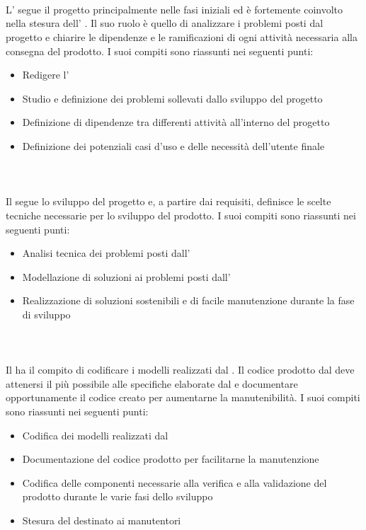 \paragraph{\ana{}}\mbox{}\\
\mbox{}\\
L' \ana{} segue il progetto principalmente nelle fasi iniziali ed è fortemente coinvolto nella stesura dell' \AdR{}. Il suo ruolo è quello di analizzare i problemi posti dal progetto e chiarire le dipendenze e le ramificazioni di ogni attività necessaria alla consegna del prodotto.
I suoi compiti sono riassunti nei seguenti punti:
\begin{itemize}
\item Redigere l'\AdR{}
\item Studio e definizione dei problemi sollevati dallo sviluppo del progetto
\item Definizione di dipendenze tra differenti attività all'interno del progetto
\item Definizione dei potenziali casi d'uso e delle necessità dell'utente finale
\end{itemize}

\paragraph{\prog{}}\mbox{}\\
\mbox{}\\
Il \prog{} segue lo sviluppo del progetto e, a partire dai requisiti, definisce le scelte tecniche necessarie per lo sviluppo del prodotto. 
I suoi compiti sono riassunti nei seguenti punti:
\begin{itemize}
\item Analisi tecnica dei problemi posti dall' \ana{}
\item Modellazione di soluzioni ai problemi posti dall' \ana{}
\item Realizzazione di soluzioni sostenibili e di facile manutenzione durante la fase di sviluppo
\end{itemize}

\paragraph{\progr{}}\mbox{}\\
\mbox{}\\
Il \progr{} ha il compito di codificare i modelli realizzati dal \prog{}. Il codice prodotto dal \progr{} deve attenersi il più possibile alle specifiche elaborate dal \prog{} e documentare opportunamente il codice creato per aumentarne la manutenibilità.
I suoi compiti sono riassunti nei seguenti punti:
\begin{itemize}
\item Codifica dei modelli realizzati dal \prog{}
\item Documentazione del codice prodotto per facilitarne la manutenzione
\item Codifica delle componenti necessarie alla verifica e alla validazione del prodotto durante le varie fasi dello sviluppo
\item Stesura del \MU{} destinato ai manutentori
\end{itemize}

